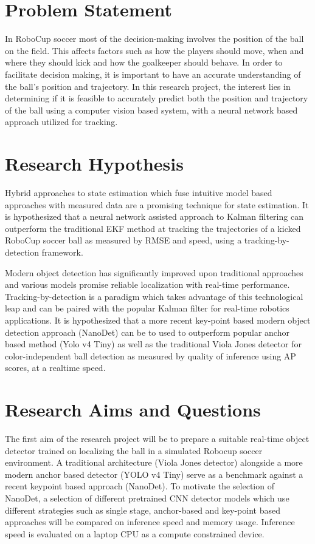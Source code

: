 \documentclass[a4paper,twoside,12pt]{report}
\begin{document}
\section{Problem Statement}

In RoboCup soccer most of the decision-making involves the position of the ball on the field. This affects factors such as how the players should move, when and where they should kick and how the goalkeeper should behave. In order to facilitate decision making, it is important to have an accurate understanding of the ball’s position and trajectory. In this research project, the interest lies in determining if it is feasible to accurately predict both the position and trajectory of the ball using a computer vision based system, with a neural network based approach utilized for tracking.

\section{Research Hypothesis}

Hybrid approaches to state estimation which fuse intuitive model based approaches with measured data are a promising technique for state estimation. It is hypothesized that a neural network assisted approach to Kalman filtering can outperform the traditional EKF method at tracking the trajectories of a kicked RoboCup soccer ball as measured by RMSE and speed, using a tracking-by-detection framework.

Modern object detection has significantly improved upon traditional approaches and various models promise reliable localization with real-time performance. Tracking-by-detection is a paradigm which takes advantage of this technological leap and can be paired with the popular Kalman filter for real-time robotics applications. It is hypothesized that a more recent key-point based modern object detection approach (NanoDet) can be to used to outperform popular anchor based method (Yolo v4 Tiny) as well as the traditional Viola Jones detector for color-independent ball detection as measured by quality of inference using AP scores, at a realtime speed. 

\section{Research Aims and Questions}

The first aim of the research project will be to prepare a suitable real-time object detector trained on localizing the ball in a simulated Robocup soccer environment. A traditional architecture (Viola Jones detector) alongside a more modern anchor based detector (YOLO v4 Tiny) serve as a benchmark against a recent keypoint based approach (NanoDet). To motivate the selection of NanoDet, a selection of different pretrained CNN detector models which use different strategies such as single stage, anchor-based and key-point based approaches will be compared on inference speed and memory usage. Inference speed is evaluated on a laptop CPU as a compute constrained device. 
\end{document}
